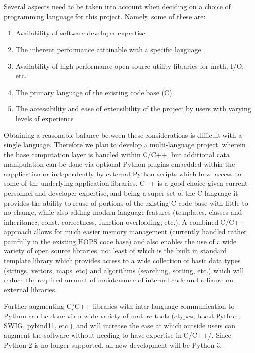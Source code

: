 \documentclass[hidelinks]{article}
\begin{document}
Several aspects need to be taken into account when deciding on a choice of programming language for this project. Namely, some of these are:
\begin{enumerate}
 \item Availability of software developer expertise.
 \item The inherent performance attainable with a specific language.
 \item Availability of high performance open source utility libraries for math, I/O, etc.
 \item The primary language of the existing code base (C).
 \item The accessibility and ease of extensibility of the project by users with varying levels of experience
\end{enumerate}

Obtaining a reasonable balance between these considerations is difficult with a single language. Therefore we
plan to develop a multi-language project, wherein the base computation layer is handled within C/C++,
but additional data manipulation can be done via optional Python plugins embedded within the aapplication
or independently by external Python scripts which have access to some of the underlying application libraries.
C++ is a good choice given current personnel and developer expertise, and being a super-set of the C language
it provides the ability to reuse of portions of the existing C code base with little to no change, while also adding modern language features
(templates, classes and inheritance, const. correctness, function overloading, etc.). A combined C/C++ approach
allows for much easier memory management (currently handled rather painfully in the existing HOPS code base) and also
enables the use of a wide variety of open source libraries, not least of which is the built in standard template library
which provides access to a wide collection of basic data types (strings, vectors, maps, etc) and algorithms (searching, sorting, etc.)
which will reduce the required amount of maintenance of internal code and reliance on external libraries.

Further augmenting C/C++ libraries with inter-language communication to Python can be done via a wide variety of mature tools
(ctypes, boost.Python, SWIG, pybind11, etc.), and will increase the ease at which outside users can augment the software without
needing to have expertise in C/C++/. Since Python 2 is no longer supported, all new development will be Python 3.
\end{document}
